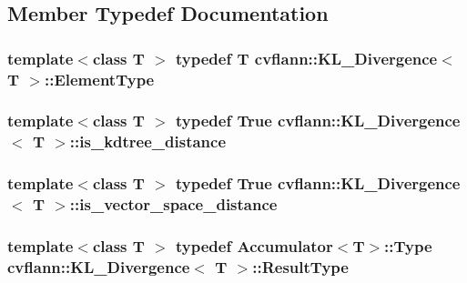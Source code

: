 \subsection{Member Typedef Documentation}
\hypertarget{structcvflann_1_1KL__Divergence_abd41c2b26ab04092a777edbc538f13b7}{
\subsubsection[{Element\-Type}]{\setlength{\rightskip}{0pt plus 5cm}template$<$class T $>$ typedef {\bf T} {\bf cvflann\-::\-K\-L\-\_\-\-Divergence}$<$ {\bf T} $>$\-::{\bf Element\-Type}}}\label{structcvflann_1_1KL__Divergence_abd41c2b26ab04092a777edbc538f13b7}
\hypertarget{structcvflann_1_1KL__Divergence_a76ae60a1f10787287d1cdf58bb1f2837}{
\subsubsection[{is\-\_\-kdtree\-\_\-distance}]{\setlength{\rightskip}{0pt plus 5cm}template$<$class T $>$ typedef {\bf True} {\bf cvflann\-::\-K\-L\-\_\-\-Divergence}$<$ {\bf T} $>$\-::{\bf is\-\_\-kdtree\-\_\-distance}}}\label{structcvflann_1_1KL__Divergence_a76ae60a1f10787287d1cdf58bb1f2837}
\hypertarget{structcvflann_1_1KL__Divergence_a97aacbeceba731095e7b303fa9a2d60b}{
\subsubsection[{is\-\_\-vector\-\_\-space\-\_\-distance}]{\setlength{\rightskip}{0pt plus 5cm}template$<$class T $>$ typedef {\bf True} {\bf cvflann\-::\-K\-L\-\_\-\-Divergence}$<$ {\bf T} $>$\-::{\bf is\-\_\-vector\-\_\-space\-\_\-distance}}}\label{structcvflann_1_1KL__Divergence_a97aacbeceba731095e7b303fa9a2d60b}
\hypertarget{structcvflann_1_1KL__Divergence_adc6bd17c29d9bc0ecea2210dbc47b91a}{
\subsubsection[{Result\-Type}]{\setlength{\rightskip}{0pt plus 5cm}template$<$class T $>$ typedef {\bf Accumulator}$<${\bf T}$>$\-::Type {\bf cvflann\-::\-K\-L\-\_\-\-Divergence}$<$ {\bf T} $>$\-::{\bf Result\-Type}}}\label{structcvflann_1_1KL__Divergence_adc6bd17c29d9bc0ecea2210dbc47b91a}


